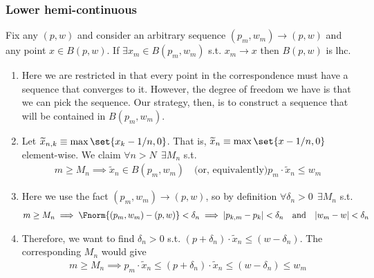 \documentclass{article}
\begin{document}
\subsubsection{Lower hemi-continuous}
\label{ssub:appendix_lower_hemi_continuous}

Fix any $(p, w)$ and consider an arbitrary sequence $(p_m, w_m) \to (p, w)$ and any point $x \in B(p, w)$. If $\exists x_m \in B(p_m, w_m)$ s.t. $x_m \to x$ then $B(p, w)$ is lhc.
\begin{enumerate}[1.]
  \item Here we are restricted in that every point in the correspondence must have a sequence that converges to it. However, the degree of freedom we have is that we can pick the sequence. Our strategy, then, is to construct a sequence that will be contained in $B(p_m, w_m)$.

  \item Let $\widetilde{x}_{n, k} \equiv \max\set{x_k - 1/n, 0}$. That is, $\widetilde{x}_n \equiv  \max \set{x - 1/n, 0}$ element-wise.  We claim $\forall n > N ~~ \exists M_n$ s.t.
    \begin{align*}
      m \ge M_n
      \implies
      \widetilde{x}_n
      \in
      B(p_m, w_m)
      \quad
      \text{(or, equivalently)}
      p_m
      \cdot
      \widetilde{x}_n
      \le
      w_m
    \end{align*}

  \item Here we use the fact $(p_m, w_m) \to (p, w)$, so by definition $\forall \delta_n > 0 ~~ \exists M_n$ s.t.
    \begin{align*}
      m \ge M_n
      \implies
      \Fnorm{(p_m, w_m) - (p, w)}
      <
      \delta_n
      \implies
      |p_{k, m} - p_k| < \delta_n
      \quad
      \text{and}
      \quad
      |w_m - w| < \delta_n
    \end{align*}

  \item Therefore, we want to find $\delta_n > 0$ s.t.  $(p + \delta_n) \cdot \widetilde{x}_n \le (w - \delta_n)$. The corresponding $M_n$ would give
    \begin{align*}
      m \ge M_n
      \implies
      p_m \cdot \widetilde{x}_n
      \le
      (p + \delta_n) \cdot \widetilde{x}_n
      \le
      (w - \delta_n)
      \le
      w_m
    \end{align*}


\end{enumerate}
\end{document}
